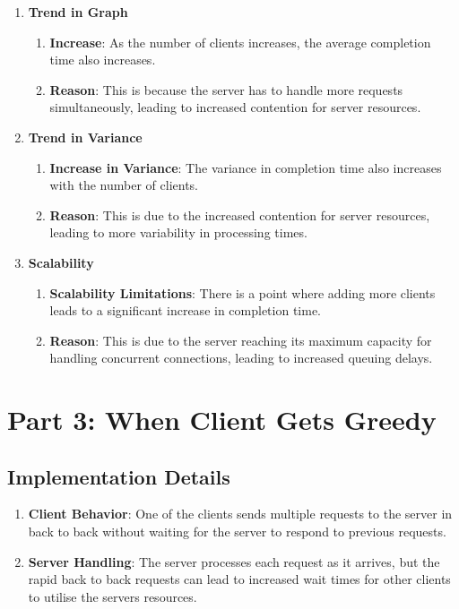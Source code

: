 \documentclass[12pt]{article}
\begin{document}
\begin{enumerate}
    \item \textbf{Trend in Graph}
    \begin{enumerate}
        \item \textbf{Increase}: As the number of clients increases, the average completion time also increases.
        \item \textbf{Reason}: This is because the server has to handle more requests simultaneously, leading to increased contention for server resources.
    \end{enumerate}
    \item \textbf{Trend in Variance}
    \begin{enumerate}
        \item \textbf{Increase in Variance}: The variance in completion time also increases with the number of clients.
        \item \textbf{Reason}: This is due to the increased contention for server resources, leading to more variability in processing times.
    \end{enumerate}
    \item \textbf{Scalability}
    \begin{enumerate}
        \item \textbf{Scalability Limitations}: There is a point where adding more clients leads to a significant increase in completion time.
        \item \textbf{Reason}: This is due to the server reaching its maximum capacity for handling concurrent connections, leading to increased queuing delays.
    \end{enumerate}
\end{enumerate}

\section{Part 3: When Client Gets Greedy}

\subsection{Implementation Details}
\begin{enumerate}
    \item \textbf{Client Behavior}: One of the clients sends multiple requests to the server in back to back without waiting for the server to respond to previous requests.
    \item \textbf{Server Handling}: The server processes each request as it arrives, but the rapid back to back requests can lead to increased wait times for other clients to utilise the servers resources.
\end{enumerate}
\end{document}
